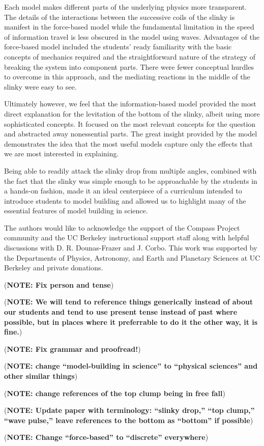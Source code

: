 \documentclass[prb,preprint]{revtex4-1}
\newcommand{\NOTE}[1]{\marginpar{\footnotesize\textbf{NOTE}} (\textbf{NOTE: #1})}
\begin{document}
Each model makes different parts of the underlying physics
more transparent. The details of the interactions between the successive coils
of the slinky is manifest in the force-based model while the fundamental
limitation in the speed of information travel is less obscured in the model
using waves. Advantages of the force-based model included the students' ready
familiarity with the basic concepts of mechanics required and the straightforward
nature of the strategy of breaking the system into component parts. There were
fewer conceptual hurdles to overcome in this approach, and the mediating
reactions in the middle of the slinky were easy to see. 

Ultimately however, we feel that the information-based model provided the
most direct explanation for the levitation of the bottom of the slinky, albeit
using more sophisticated concepts. It focused
on the most relevant concepts for the question and abstracted away
nonessential parts. The great insight provided by the
model demonstrates the idea that the most useful models
capture only the effects that we are most interested in explaining.

Being able to readily attack the slinky drop from multiple angles, combined with
the fact that the slinky was simple enough to be approachable by the students
in a hands-on fashion, made it an ideal centerpiece of a curriculum intended to
introduce students to model building and allowed us to highlight many of the
essential features of model building in science.


\acknowledgments The authors would like to acknowledge the support of the Compass
Project community and the UC Berkeley instructional support staff along with
helpful discussions with D. R. Dounas-Frazer and J. Corbo.
This work was supported by the Departments of Physics, Astronomy, and Earth and
Planetary Sciences at UC Berkeley and private donations.

\NOTE{Fix person and tense}

\NOTE{We will tend to reference things generically instead of about our students and tend to use present tense instead of past where possible, but in places where it preferrable to do it the other way, it is fine.}

\NOTE{Fix grammar and proofread!}

\NOTE{change ``model-building in science'' to ``physical sciences'' and other similar things}

\NOTE{change references of the top clump being in free fall}

\NOTE{Update paper with terminology: ``slinky drop,'' ``top clump,'' ``wave pulse,'' leave references to the bottom as ``bottom'' if possible}

\NOTE{Change ``force-based'' to ``discrete'' everywhere}


\end{document}
